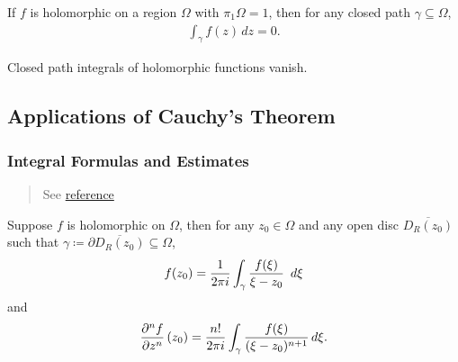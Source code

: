 \begin{theorem}\label{CauchyTheorem}

If \(f\) is holomorphic on a region \(\Omega\) with
\(\pi_1 \Omega = 1\), then for any closed path
\(\gamma \subseteq \Omega\),
\begin{align*} 
\int_{\gamma} f(z) \,dz= 0
.\end{align*}

\end{theorem}

\begin{slogan}

Closed path integrals of holomorphic functions vanish.

\end{slogan}

\hypertarget{applications-of-cauchys-theorem}{%
\subsection{Applications of Cauchy's
Theorem}\label{applications-of-cauchys-theorem}}

\hypertarget{integral-formulas-and-estimates}{%
\subsubsection{Integral Formulas and
Estimates}\label{integral-formulas-and-estimates}}

\begin{quote}
See
\href{http://home.iitk.ac.in/~psraj/mth102/lecture_notes/comp8.pdf}{reference}
\end{quote}

\begin{theorem}\label{CauchyIntegral}

Suppose \(f\) is holomorphic on \(\Omega\), then for any
\(z_0 \in \Omega\) and any open disc \(\overline{D_R(z_0)}\) such that
\(\gamma \coloneqq{{\partial}}\overline{D_R(z_0)} \subseteq \Omega\),
\begin{align*}
f(z_0) = {1 \over 2\pi i} \int_{\gamma} {f(\xi) \over \xi-z_0}\ \,d\xi
\end{align*}
and
\begin{align*}
{\frac{\partial ^nf }{\partial z^n}\,}(z_0) = {n! \over 2\pi i} \int_{\gamma} {f(\xi) \over (\xi - z_0)^{n+1}} \,d\xi
.\end{align*}

\end{theorem}


